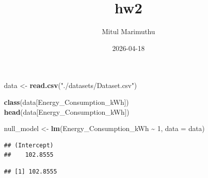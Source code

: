 \documentclass[
]{article}
\title{hw2}
\author{Mitul Marimuthu}
\date{2026-04-18}
\newenvironment{Shaded}{\begin{snugshade}}{\end{snugshade}}
\newcommand{\AttributeTok}[1]{\textcolor[rgb]{0.13,0.29,0.53}{#1}}
\newcommand{\DecValTok}[1]{\textcolor[rgb]{0.00,0.00,0.81}{#1}}
\newcommand{\FunctionTok}[1]{\textcolor[rgb]{0.13,0.29,0.53}{\textbf{#1}}}
\newcommand{\NormalTok}[1]{#1}
\newcommand{\OtherTok}[1]{\textcolor[rgb]{0.56,0.35,0.01}{#1}}
\newcommand{\SpecialCharTok}[1]{\textcolor[rgb]{0.81,0.36,0.00}{\textbf{#1}}}
\newcommand{\StringTok}[1]{\textcolor[rgb]{0.31,0.60,0.02}{#1}}
\begin{document}
\maketitle

\begin{Shaded}
\begin{Highlighting}[]
\NormalTok{data }\OtherTok{\textless{}{-}} \FunctionTok{read.csv}\NormalTok{(}\StringTok{"./datasets/Dataset.csv"}\NormalTok{)}
\end{Highlighting}
\end{Shaded}

\begin{Shaded}
\begin{Highlighting}[]
\FunctionTok{class}\NormalTok{(data[}\StringTok{\textquotesingle{}Energy\_Consumption\_kWh\textquotesingle{}}\NormalTok{])}
\FunctionTok{head}\NormalTok{(data[}\StringTok{\textquotesingle{}Energy\_Consumption\_kWh\textquotesingle{}}\NormalTok{])}
\end{Highlighting}
\end{Shaded}

\begin{Shaded}
\begin{Highlighting}[]
\NormalTok{null\_model }\OtherTok{\textless{}{-}} \FunctionTok{lm}\NormalTok{(Energy\_Consumption\_kWh }\SpecialCharTok{\textasciitilde{}} \DecValTok{1}\NormalTok{, }\AttributeTok{data =}\NormalTok{ data)}
\end{Highlighting}
\end{Shaded}

\begin{Shaded}
\end{Shaded}

\begin{verbatim}
## (Intercept) 
##    102.8555
\end{verbatim}

\begin{Shaded}
\end{Shaded}

\begin{verbatim}
## [1] 102.8555
\end{verbatim}
\end{document}
